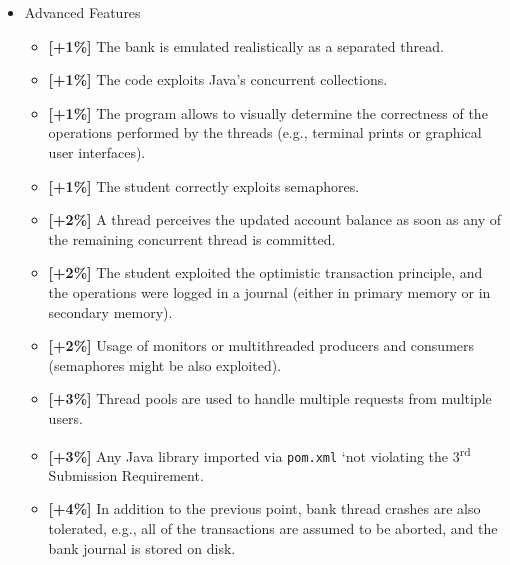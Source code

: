 \documentclass{article}
\begin{document}
\begin{itemize}
\item Advanced Features
\begin{itemize}
	\item  \textbf{[+1\%]} The bank is emulated realistically as a separated thread.
	\item  \textbf{[+1\%]} The code exploits Java's concurrent collections.
	\item \textbf{[+1\%]} The program allows to visually determine the correctness of the operations performed by the threads (e.g., terminal prints or graphical user interfaces).
	\item \textbf{[+1\%]} The student correctly exploits semaphores.
	\item  \textbf{[+2\%]} A thread perceives the updated account balance as soon as any of the remaining concurrent thread is committed.
	\item \textbf{[+2\%]} The student exploited the optimistic transaction principle, and the operations were logged in a journal (either in primary memory or in secondary memory).
	\item \textbf{[+2\%]} Usage of monitors or multithreaded producers and consumers (semaphores might be also exploited).
	\item \textbf{[+3\%]} Thread pools are used to handle multiple requests from multiple users.
	\item \textbf{[+3\%]} Any Java library imported via \texttt{pom.xml} `not violating the 3\textsuperscript{rd} Submission Requirement.
	\item  \textbf{[+4\%]} In addition to the previous point, bank thread crashes are also tolerated, e.g., all of the transactions are assumed to be aborted, and the bank journal is stored on disk. 
\end{itemize}
	\end{itemize}


	
\end{document}

